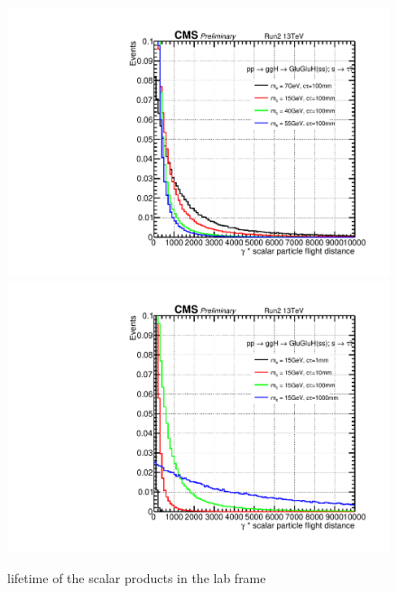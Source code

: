 \begin{figure}[h!]
  \label{fig:scalarpt}
  \centering
  \includegraphics[width=0.57\linewidth]{figs/Scalar_gammactau100mm.pdf}
  \includegraphics[width=0.57\linewidth]{figs/Scalar_gammactau15GeV.pdf}
  \caption{lifetime of the scalar products in the lab frame}
\end{figure}

